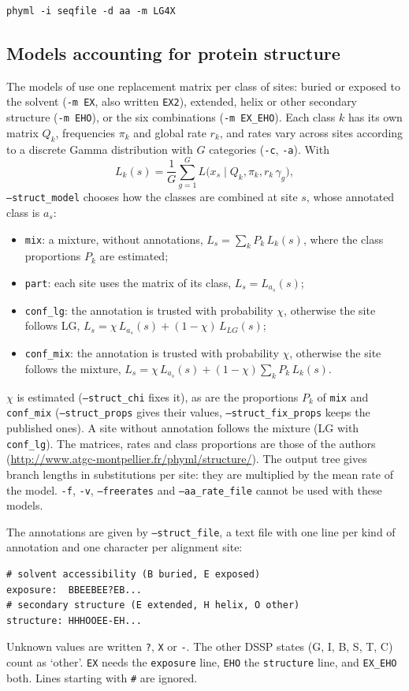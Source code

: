 \documentclass[a4paper,12pt]{article}
\newcommand{\x}[1]{\texttt{#1}}
\begin{document}
\begin{verbatim}
phyml -i seqfile -d aa -m LG4X
\end{verbatim}

\subsection{Models accounting for protein structure}\label{sec:structure}

The models of \cite{le10} use one replacement matrix per class of sites: buried or exposed to the
solvent (\x{-m EX}, also written \x{EX2}), extended, helix or other secondary structure (\x{-m EHO}),
or the six combinations (\x{-m EX\_EHO}). Each class $k$ has its own matrix $Q_k$, frequencies
$\pi_k$ and global rate $r_k$, and rates vary across sites according to a discrete Gamma
distribution with $G$ categories (\x{-c}, \x{-a}). With
\[ L_k(s) = \frac{1}{G}\sum_{g=1}^{G} L\big(x_s \mid Q_k, \pi_k, r_k\,\gamma_g\big), \]
\x{--struct\_model} chooses how the classes are combined at site $s$, whose annotated class is $a_s$:
\begin{itemize}
\item \x{mix}: a mixture, without annotations, $L_s = \sum_k P_k\, L_k(s)$, where the class
  proportions $P_k$ are estimated;
\item \x{part}: each site uses the matrix of its class, $L_s = L_{a_s}(s)$;
\item \x{conf\_lg}: the annotation is trusted with probability $\chi$, otherwise the site follows
  LG, $L_s = \chi\, L_{a_s}(s) + (1-\chi)\, L_{LG}(s)$;
\item \x{conf\_mix}: the annotation is trusted with probability $\chi$, otherwise the site follows
  the mixture, $L_s = \chi\, L_{a_s}(s) + (1-\chi) \sum_k P_k\, L_k(s)$.
\end{itemize}
$\chi$ is estimated (\x{--struct\_chi} fixes it), as are the proportions $P_k$ of \x{mix} and
\x{conf\_mix} (\x{--struct\_props} gives their values, \x{--struct\_fix\_props} keeps the published
ones). A site without annotation follows the mixture (LG with \x{conf\_lg}). The matrices, rates and
class proportions are those of the authors (\url{http://www.atgc-montpellier.fr/phyml/structure/}).
The output tree gives branch lengths in substitutions per site: they are multiplied by the mean rate
of the model. \x{-f}, \x{-v}, \x{--freerates} and \x{--aa\_rate\_file} cannot be used with these models.

The annotations are given by \x{--struct\_file}, a text file with one line per kind of
annotation and one character per alignment site:
\begin{verbatim}
# solvent accessibility (B buried, E exposed)
exposure:  BBEEBEE?EB...
# secondary structure (E extended, H helix, O other)
structure: HHHOOEE-EH...
\end{verbatim}
Unknown values are written \x{?}, \x{X} or \x{-}. The other DSSP states (G, I, B, S, T, C) count as
`other'. \x{EX} needs the \x{exposure} line, \x{EHO} the \x{structure} line, and \x{EX\_EHO} both.
Lines starting with \x{\#} are ignored.
\end{document}
